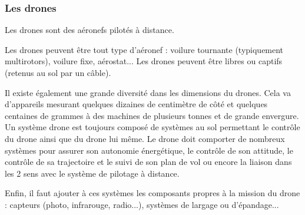 \subsubsection{Les drones}
Les drones sont des aéronefs pilotés à distance. 

Les drones peuvent être tout type d'aéronef : voilure tournante (typiquement multirotors), voilure fixe, aérostat... Les drones peuvent être libres ou captifs (retenus au sol par un câble).

Il existe également une grande diversité dans les dimensions du drones. Cela va d'appareils mesurant quelques dizaines de centimètre de côté et quelques centaines de grammes à des machines de plusieurs tonnes et de grande envergure. \\

Un système drone est toujours composé de systèmes au sol permettant le contrôle du drone ainsi que du drone lui même. Le drone doit comporter de nombreux systèmes pour assurer son autonomie énergétique, le contrôle de son attitude, le contrôle de sa trajectoire et le suivi de son plan de vol ou encore la liaison dans les 2 sens avec le système de pilotage à distance. 

Enfin, il faut ajouter à ces systèmes les composants propres à la mission du drone : capteurs (photo, infrarouge, radio...), systèmes de largage ou d'épandage...
